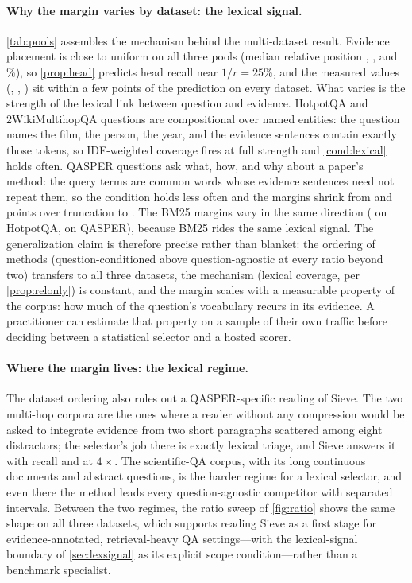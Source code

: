 \documentclass[preprint,12pt]{elsarticle}
\theoremstyle{remark}
\newcommand{\method}{Sieve}
\begin{document}
\paragraph{Why the margin varies by dataset: the lexical signal.}
\label{sec:lexsignal}
\autoref{tab:pools} assembles the mechanism behind the multi-dataset
result. Evidence placement is close to uniform on all three pools
(median relative position \PoolQMedPos, \PoolHMedPos, and
\PoolWMedPos\%), so \autoref{prop:head} predicts head recall near
$1/r = 25\%$, and the measured values (\RecQHea, \RecHHea,
\RecWHea) sit within a few points of the prediction on every
dataset. What varies is the strength of the lexical link between
question and evidence. HotpotQA and 2WikiMultihopQA questions are
compositional over named entities: the question names the film, the
person, the year, and the evidence sentences contain exactly those
tokens, so IDF-weighted coverage fires at full strength and
\autoref{cond:lexical} holds often. QASPER questions ask what, how,
and why about a paper's method: the query terms are common words
whose evidence sentences need not repeat them, so the condition holds
less often and the margins shrink from \PairHSH{} and \PairWSH{}
points over truncation to \PairQSH{}. The BM25 margins vary in the
same direction (\PairHSBm{} on HotpotQA, \PairQSBm{} on QASPER),
because BM25 rides the same lexical signal. The generalization claim
is therefore precise rather than blanket: the ordering of methods
(question-conditioned above question-agnostic at every ratio beyond
two) transfers to all three datasets, the mechanism (lexical
coverage, per \autoref{prop:relonly}) is constant, and the margin
scales with a measurable property of the corpus: how much of the
question's vocabulary recurs in its evidence. A practitioner can
estimate that property on a sample of their own traffic before
deciding between a statistical selector and a hosted scorer.

\paragraph{Where the margin lives: the lexical regime.}
The dataset ordering also rules out a QASPER-specific reading of
\method{}. The two multi-hop corpora are the ones where a reader
without any compression would be asked to integrate evidence from two
short paragraphs scattered among eight distractors; the selector's job
there is exactly lexical triage, and \method{} answers it with recall
\RecHSie{} and \RecWSie{} at $4\times$. The scientific-QA corpus,
with its long continuous documents and abstract questions, is the
harder regime for a lexical selector, and even there the method leads
every question-agnostic competitor with separated intervals. Between
the two regimes, the ratio sweep of \autoref{fig:ratio} shows the same
shape on all three datasets, which supports reading \method{} as a
first stage for evidence-annotated, retrieval-heavy QA settings---with
the lexical-signal boundary of \autoref{sec:lexsignal} as its explicit
scope condition---rather than a benchmark specialist.
\end{document}
